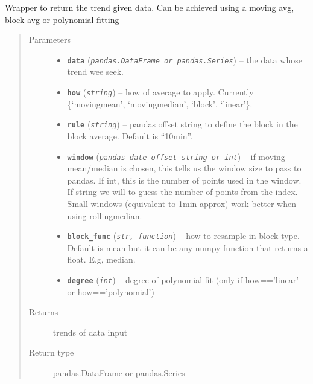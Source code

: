 \documentclass[a4paper,10pt,oneside]{sphinxmanual}
\begin{document}
\begin{fulllineitems}
\label{pymicra:pymicra.data.trend}
Wrapper to return the trend given data. Can be achieved using a moving avg, block avg or polynomial fitting
\begin{quote}\begin{description}
\item[{Parameters}] \leavevmode\begin{itemize}
\item {} 
\textbf{\texttt{data}} (\emph{\texttt{pandas.DataFrame or pandas.Series}}) -- the data whose trend wee seek.

\item {} 
\textbf{\texttt{how}} (\emph{\texttt{string}}) -- how of average to apply. Currently \{`movingmean', `movingmedian', `block', `linear'\}.

\item {} 
\textbf{\texttt{rule}} (\emph{\texttt{string}}) -- pandas offset string to define the block in the block average. Default is ``10min''.

\item {} 
\textbf{\texttt{window}} (\emph{\texttt{pandas date offset string or int}}) -- if moving mean/median is chosen, this tells us the window size to pass to pandas. If int,
this is the number of points used in the window. If string we will to guess the number of
points from the index.
Small windows (equivalent to 1min approx) work better when using rollingmedian.

\item {} 
\textbf{\texttt{block\_func}} (\emph{\texttt{str, function}}) -- how to resample in block type. Default is mean but it can be any numpy function
that returns a float. E.g, median.

\item {} 
\textbf{\texttt{degree}} (\emph{\texttt{int}}) -- degree of polynomial fit (only if how=='linear' or how=='polynomial')

\end{itemize}

\item[{Returns}] \leavevmode
trends of data input

\item[{Return type}] \leavevmode
pandas.DataFrame or pandas.Series

\end{description}\end{quote}

\end{fulllineitems}
\end{document}

